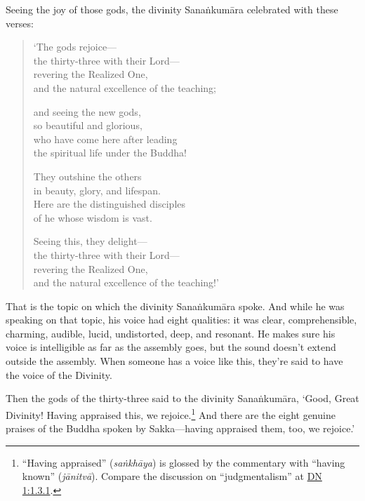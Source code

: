 \documentclass[12pt,openany]{book}%
\begin{document}
Seeing the joy of those gods, the divinity \textsanskrit{Sanaṅkumāra} celebrated with these verses: 

\begin{verse}%
‘The gods rejoice—\\
the thirty-three with their Lord—\\
revering the Realized One, \\
and the natural excellence of the teaching; 

and seeing the new gods, \\
so beautiful and glorious, \\
who have come here after leading \\
the spiritual life under the Buddha! 

They outshine the others \\
in beauty, glory, and lifespan. \\
Here are the distinguished disciples \\
of he whose wisdom is vast. 

Seeing this, they delight—\\
the thirty-three with their Lord—\\
revering the Realized One, \\
and the natural excellence of the teaching!’ 

%
\end{verse}

That is the topic on which the divinity \textsanskrit{Sanaṅkumāra} spoke. And while he was speaking on that topic, his voice had eight qualities: it was clear, comprehensible, charming, audible, lucid, undistorted, deep, and resonant. He makes sure his voice is intelligible as far as the assembly goes, but the sound doesn’t extend outside the assembly. When someone has a voice like this, they’re said to have the voice of the Divinity. 

Then the gods of the thirty-three said to the divinity \textsanskrit{Sanaṅkumāra}, ‘Good, Great Divinity! Having appraised this, we rejoice.\footnote{“Having appraised” (\textit{\textsanskrit{saṅkhāya}}) is glossed by the commentary with “having known” (\textit{\textsanskrit{jānitvā}}). Compare the discussion on “judgmentalism” at \href{https://suttacentral.net/dn1/en/sujato\#1.3.1}{DN 1:1.3.1}. } And there are the eight genuine praises of the Buddha spoken by Sakka—having appraised them, too, we rejoice.’ 
\end{document}
